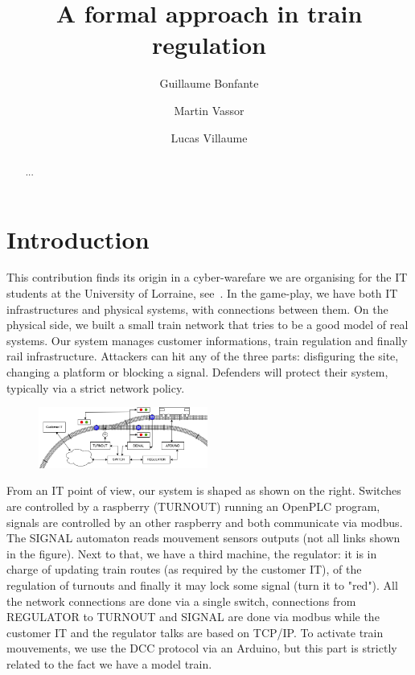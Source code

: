 \documentclass[runningheads]{llncs}
\begin{document}
%
\title{A formal approach in train regulation}
%
%
\author{Guillaume Bonfante \and Martin Vassor  \and Lucas Villaume}
%
%
%
\maketitle
%
\begin{abstract}
	...

\end{abstract}


\section{Introduction}
\label{sec:introduction}

This contribution finds its origin in a cyber-warefare we are organising for the IT students at the University of Lorraine, see~\cite{CHE}. In the game-play, we have both IT infrastructures and physical systems, with connections between them. On the physical side, we built a small train network that tries to be a good model of real systems.  Our system manages customer informations, train regulation and finally rail infrastructure. Attackers can hit any of the three parts: disfiguring the site, changing a platform or blocking a signal. Defenders will protect their system, typically via a strict network policy.

\medskip

\begin{figure}
\vspace{-6mm}
\includegraphics[height=20mm]{TrainSchema.png}
\end{figure}


From an IT point of view, our system is shaped as shown on the right. Switches are controlled by a raspberry (TURNOUT) running an OpenPLC program, signals are controlled by an other raspberry and both communicate via modbus. The SIGNAL automaton reads mouvement sensors outputs (not all links shown in the figure). Next to that, we have a third machine, the regulator: it is in charge of updating train routes (as required by the customer IT),  of the regulation of turnouts and finally it may lock some signal (turn it to "red"). All the network connections are done via a single switch, connections from REGULATOR to TURNOUT and SIGNAL are done via modbus while the customer IT and the regulator talks  are based on TCP/IP.  To activate train mouvements, we use the DCC protocol via an Arduino, but this part is strictly related to the fact we have a model train. 
\end{document}
